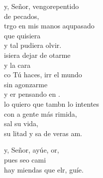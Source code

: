 \begin{cancion}%
	y, Señor, vengorepentido \\
	de  pecados,\\
	trgo en mis manos aqupasado\\
	que  quisiera \\
	y tal  pudiera olvir.\\
	\jump
	isiera dejar de otarme \\
	y  la cara\\
	co Tú haces, irr el mundo\\
	sin agonzarme \\
	y er pensando en .\\
	\jump
	lo quiero que tambn lo intentes\\
	con a gente más rimida, \\
	sal su vida,\\
	su litad y sa de veras am.\jump\\
	\begin{chorus}%
		y, Señor, ayúe, or, \\
		pues seo cami \\
		hay miendas que elr, guíe.\jump\\
	\end{chorus}%
	\jump
\end{cancion}%
